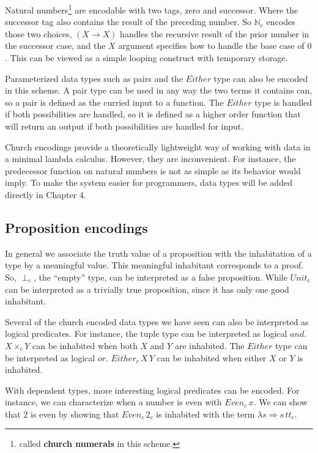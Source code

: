 Natural numbers\footnote{called \textbf{church numerals} in this scheme.} are encodable with two tags, zero and successor.
Where the successor tag also contains the result of the preceding number.
So $\mathbb{N}_{c}$ encodes those two choices, $(X\rightarrow X)$ handles the recursive result of the prior number in the successor case, and the $X$ argument specifies how to handle the base case of $0$.
This can be viewed as a simple looping construct with temporary storage.

Parameterized data types such as pairs and the $Either$ type can also be encoded in this scheme.
A pair type can be used in any way the two terms it contains can, so a pair is defined as the curried input to a function.
The $Either$ type is handled if both possibilities are handled, so it is defined as a higher order function that will return an output if both possibilities are handled for input.


Church encodings provide a theoretically lightweight way of working with data in a minimal lambda calculus.
However, they are inconvenient.
For instance, the predecessor function on natural numbers is not as simple as its behavior would imply.
To make the system easier for programmers, data types will be added directly in Chapter 4.

\subsection{Proposition encodings}

In general we associate the truth value of a proposition with the inhabitation of a type by a meaningful value.
This meaningful inhabitant corresponds to a proof.
So, $\perp_{c}$, the ``empty'' type, can be interpreted as a false proposition.
While $Unit_{c}$ can be interpreted as a trivially true proposition, since it has only one good inhabitant.

Several of the church encoded data types we have seen can also be interpreted as logical predicates.
For instance, the tuple type can be interpreted as logical $and$.
$X\times_{c}Y$ can be inhabited when both $X$ and $Y$ are inhabited.
The $Either$ type can be interpreted as logical $or$.
$Either_{c}\,X\,Y$ can be inhabited when either $X$ or $Y$ is inhabited.

With dependent types, more interesting logical predicates can be encoded.
For instance, we can characterize when a number is even with $Even_{c}\,x$.
We can show that $2$ is even by showing that $Even_{c}\,2_{c}$ is inhabited with the term $\lambda s\Rightarrow s\,tt_{c}$.


